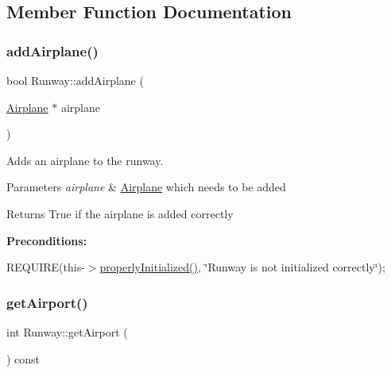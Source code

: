 \subsection{Member Function Documentation}
\mbox{\label{class_runway_ae07554e4e41faea8ef9654385449b25b}} 
\subsubsection{\texorpdfstring{add\+Airplane()}{addAirplane()}}
{\footnotesize\ttfamily bool Runway\+::add\+Airplane (\begin{DoxyParamCaption}\item[{\mbox{\hyperlink{class_airplane}{Airplane}} $\ast$}]{airplane }\end{DoxyParamCaption})}



Adds an airplane to the runway. 


\begin{DoxyParams}{Parameters}
{\em airplane} & \mbox{\hyperlink{class_airplane}{Airplane}} which needs to be added \\
\hline
\end{DoxyParams}
\begin{DoxyReturn}{Returns}
True if the airplane is added correctly
\end{DoxyReturn}
{\bfseries Preconditions\+:}
\begin{DoxyItemize}
\item R\+E\+Q\+U\+I\+RE(this-\/$>$\mbox{\hyperlink{class_runway_a360d98246cabf3aa929765f81a656348}{properly\+Initialized()}}, \char`\"{}\+Runway is not initialized correctly\char`\"{}); 
\end{DoxyItemize}\mbox{\label{class_runway_ac6d84fd93863115c2b96912b4432d76e}} 
\subsubsection{\texorpdfstring{get\+Airport()}{getAirport()}}
{\footnotesize\ttfamily int Runway\+::get\+Airport (\begin{DoxyParamCaption}{ }\end{DoxyParamCaption}) const}



